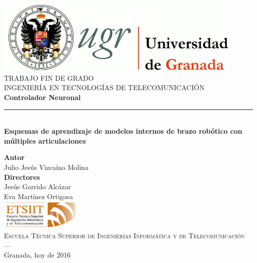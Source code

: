 \begin{titlepage}
 
 
\newlength{\centeroffset}
\setlength{\centeroffset}{-0.5\oddsidemargin}
\addtolength{\centeroffset}{0.5\evensidemargin}
\thispagestyle{empty}

\noindent\hspace*{\centeroffset}\begin{minipage}{\textwidth}

\centering
\includegraphics[width=0.9\textwidth]{imagenes/logo_ugr.jpg}\\[1.4cm]

\textsc{ \Large TRABAJO FIN DE GRADO\\[0.2cm]}
\textsc{ INGENIERÍA EN TECNOLOGÍAS DE TELECOMUNICACIÓN}\\[1cm]
% 
{\Huge\bfseries Controlador Neuronal\\
}
\noindent\rule[-1ex]{\textwidth}{3pt}\\[3.5ex]
{\large\bfseries Esquemas de aprendizaje de modelos internos de brazo robótico con múltiples articulaciones}
\end{minipage}

\vspace{2.5cm}
\noindent\hspace*{\centeroffset}\begin{minipage}{\textwidth}
\centering

\textbf{Autor}\\ {Julio Jesús Vizcaíno Molina}\\[2.5ex]
\textbf{Directores}\\
{Jesús Garrido Alcázar\\
Eva Martínez Ortigosa}\\[2cm]
\includegraphics[width=0.3\textwidth]{imagenes/etsiit_logo.png}\\[0.1cm]
\textsc{Escuela Técnica Superior de Ingenierías Informática y de Telecomunicación}\\
\textsc{---}\\
Granada, hoy de 2016
\end{minipage}
\end{titlepage}

